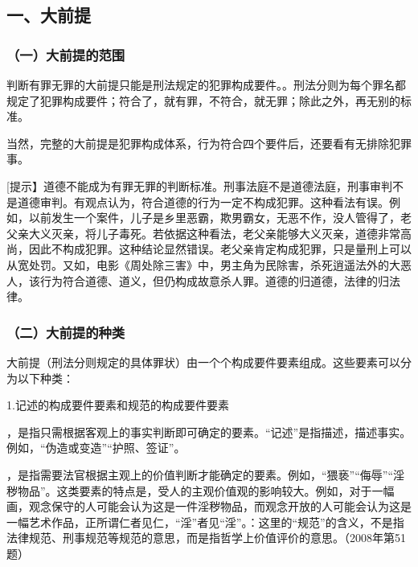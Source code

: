 
\subsection*{一、大前提}

\subsubsection*{（一）大前提的范围}

判断有罪无罪的大前提只能是刑法规定的犯罪构成要件。。刑法分则为每个罪名都规定了犯罪构成要件；符合了，就有罪，不符合，就无罪；除此之外，再无别的标准。

当然，完整的大前提是犯罪构成体系，行为符合四个要件后，还要看有无排除犯罪事。

[提示】道德不能成为有罪无罪的判断标准。刑事法庭不是道德法庭，刑事审判不是道德审判。有观点认为，符合道德的行为一定不构成犯罪。这种看法有误。例如，以前发生一个案件，儿子是乡里恶霸，欺男霸女，无恶不作，没人管得了，老父亲大义灭亲，将儿子毒死。若依据这种看法，老父亲能够大义灭亲，道德非常高尚，因此不构成犯罪。这种结论显然错误。老父亲肯定构成犯罪，只是量刑上可以从宽处罚。又如，电影《周处除三害》中，男主角为民除害，杀死逍遥法外的大恶人，该行为符合道德、道义，但仍构成故意杀人罪。道德的归道德，法律的归法律。

\subsubsection*{（二）大前提的种类}

大前提（刑法分则规定的具体罪状）由一个个构成要件要素组成。这些要素可以分为以下种类：

1.记述的构成要件要素和规范的构成要件要素

，是指只需根据客观上的事实判断即可确定的要素。“记述”是指描述，描述事实。例如，“伪造或变造”“护照、签证”。

，是指需要法官根据主观上的价值判断才能确定的要素。例如，“猥亵”“侮辱”“淫秽物品”。这类要素的特点是，受人的主观价值观的影响较大。例如，对于一幅画，观念保守的人可能会认为这是一件淫秽物品，而观念开放的人可能会认为这是一幅艺术作品，正所谓仁者见仁，“淫”者见“淫”。：这里的“规范”的含义，不是指法律规范、刑事规范等规范的意思，而是指哲学上价值评价的意思。（2008年第51题）


